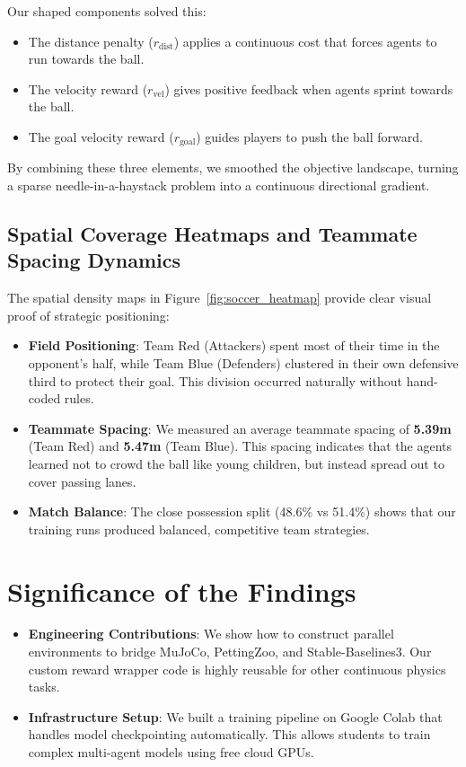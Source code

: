 Our shaped components solved this:
\begin{itemize}
    \item The distance penalty ($r_{\text{dist}}$) applies a continuous cost that forces agents to run towards the ball.
    \item The velocity reward ($r_{\text{vel}}$) gives positive feedback when agents sprint towards the ball.
    \item The goal velocity reward ($r_{\text{goal}}$) guides players to push the ball forward.
\end{itemize}
By combining these three elements, we smoothed the objective landscape, turning a sparse needle-in-a-haystack problem into a continuous directional gradient.

\subsection{Spatial Coverage Heatmaps and Teammate Spacing Dynamics}
\label{subsec:disc_spatial_analytics}

The spatial density maps in Figure~\ref{fig:soccer_heatmap} provide clear visual proof of strategic positioning:
\begin{itemize}
    \item \textbf{Field Positioning}: Team Red (Attackers) spent most of their time in the opponent's half, while Team Blue (Defenders) clustered in their own defensive third to protect their goal. This division occurred naturally without hand-coded rules.
    \item \textbf{Teammate Spacing}: We measured an average teammate spacing of \textbf{5.39m} (Team Red) and \textbf{5.47m} (Team Blue). This spacing indicates that the agents learned not to crowd the ball like young children, but instead spread out to cover passing lanes.
    \item \textbf{Match Balance}: The close possession split (48.6\% vs 51.4\%) shows that our training runs produced balanced, competitive team strategies.
\end{itemize}

\section{Significance of the Findings}
\label{sec:significance}

\begin{itemize}
    \item \textbf{Engineering Contributions}: We show how to construct parallel environments to bridge MuJoCo, PettingZoo, and Stable-Baselines3. Our custom reward wrapper code is highly reusable for other continuous physics tasks.
    \item \textbf{Infrastructure Setup}: We built a training pipeline on Google Colab that handles model checkpointing automatically. This allows students to train complex multi-agent models using free cloud GPUs.
\end{itemize}

